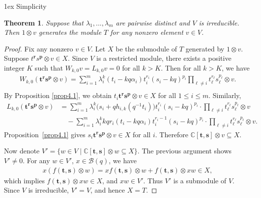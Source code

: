 \documentclass[a4paper]{amsart}
\makeatletter
\numberwithin{equation}{section}
\newtheorem{theorem}{Theorem}[section]
\def\subsection{\@startsection{subsection}{2}%
  \z@{1.5ex \@plus .5ex \@minus .2ex}%
  {1ex}%
  {\normalfont\bfseries}}
\makeatother
\begin{document}
\subsection{Simplicity}

\begin{theorem}\label{thm4.2}
    Suppose that $\lambda_{1},...,\lambda_{m}$ are pairwise distinct and $V$ is irreducible. Then $1\otimes v$ generates the module $T$ for any nonzero element $v\in V$.
\end{theorem}
\begin{proof}
    Fix any nonzero $v\in V$. Let $X$ be the submodule of $T$ generated by $1\otimes v$. Suppose $t^{\mathbf{r}}s^{\mathbf{p}}\otimes v\in X$. Since $V$ is a restricted module, there exists a positive integer $K$ such that $W_{k,0}v=L_{k,0}v=0$ for all $k>K$. Then for all $k>K$, we have 
    \begin{align*}
    W_{k,0}(\mathbf t^{\mathbf r}\mathbf s^{\mathbf p}\otimes v)
=\sum_{i=1}^m\lambda_i^k(t_i-kq\alpha_i)t_i^{r_i}(s_i-kq)^{p_i}
\prod_{\ell\ne i}t_\ell^{r_\ell}s_\ell^{p_\ell}\otimes v.\\
    \end{align*}
By Proposition \ref{prop4.1}, we obtain $t_i\mathbf t^{\mathbf r}\mathbf s^{\mathbf p}\otimes v\in X$ for all $1\leq i\leq m$. Similarly, 
\begin{align*}
        L_{k,0}(\mathbf t^{\mathbf r}\mathbf s^{\mathbf p}\otimes v)
&=\sum_{i=1}^m\lambda_i^k
\bigl(s_i+qh_{i,k}(q^{-1}t_i)\bigr)t_i^{r_i}(s_i-kq)^{p_i}\cdot\prod_{\ell\ne i}t_\ell^{r_\ell}s_\ell^{p_\ell}\otimes v\\
&\quad-\sum_{i=1}^m\lambda_i^kkqr_i
(t_i-kq\alpha_i)t_i^{r_i-1}(s_i-kq)^{p_i}\cdot\prod_{\ell\ne i}t_\ell^{r_\ell}s_\ell^{p_\ell}\otimes v.
    \end{align*}
    Proposition~\ref{prop4.1} gives $s_i\mathbf t^{\mathbf r}\mathbf s^{\mathbf p}\otimes v\in X$ for all $i$. Therefore $\mathbb{C}[\mathbf{t},\mathbf{s}]\otimes v\subseteq X$.

    Now denote $V'=\{w\in V\mid\mathbb{C}[\mathbf{t},\mathbf{s}]\otimes w\subseteq X\}$. The previous argument shows $V'\neq 0$. For any $w\in V'$, $x\in \mathcal{B}(q)$, we have
    \begin{align*}
        x(f(\mathbf{t},\mathbf{s})\otimes w)=xf(\mathbf{t},\mathbf{s})\otimes w+f(\mathbf{t},\mathbf{s})\otimes xw\in X,
    \end{align*}
which implies $f(\mathbf{t},\mathbf{s})\otimes xw\in X$, and $xw\in V'$. Thus $V'$ is a submodule of $V$. Since $V$ is irreducible, $V'=V$, and hence $X=T$.
\end{proof}
\end{document}
